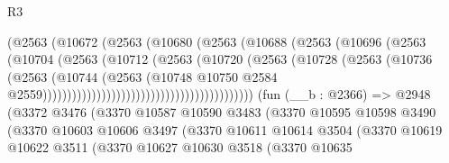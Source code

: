 \begin{lexlean}{R3}
\begin{coremodule}
                                              (@2563
                                                (@10672
                                                  (@2563
                                                    (@10680
                                                      (@2563
                                                        (@10688
                                                          (@2563
                                                            (@10696
                                                              (@2563
                                                                (@10704
                                                                  (@2563
                                                                    (@10712
                                                                      (@2563
                                                                        (@10720
                                                                          (@2563
                                                                            (@10728
                                                                              (@2563
                                                                                (@10736
                                                                                  (@2563
                                                                                    (@10744
                                                                                      (@2563
                                                                                        (@10748
                                                                                          @10750
                                                                                          @2584
                                                                                          @2559)))))))))))))))))))))))))))))))))))))))))))
    (fun (__b : @2366) =>
    @2948
      (@3372
        @3476
        (@3370
          @10587
          @10590
          @3483
          (@3370
            @10595
            @10598
            @3490
            (@3370
              @10603
              @10606
              @3497
              (@3370
                @10611
                @10614
                @3504
                (@3370
                  @10619
                  @10622
                  @3511
                  (@3370
                    @10627
                    @10630
                    @3518
                    (@3370
                      @10635

\end{coremodule}
\end{lexlean}
